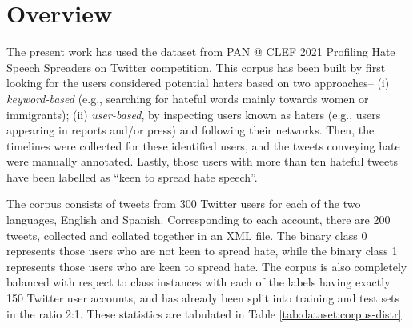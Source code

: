 
\section{Overview}
\label{sec:dataset:overview}
The present work has used the dataset from PAN @ CLEF 2021 Profiling Hate Speech Spreaders on Twitter \cite{pan21dataset} competition. This corpus has been built by first looking for the users considered potential haters based on two approaches-- (i) \emph{keyword-based} (e.g., searching for hateful words mainly towards women or immigrants); (ii) \emph{user-based}, by inspecting users known as haters (e.g., users appearing in reports and/or
press) and following their networks. Then, the timelines were collected for these identified users, and the tweets conveying hate were manually annotated. Lastly, those users with more than ten hateful tweets have been labelled as “keen to spread hate speech”.

The corpus consists of tweets from 300 Twitter users for each of the two languages, English and Spanish. Corresponding to each account, there are 200 tweets, collected and collated together in an XML file. The binary class 0 represents those users who are not keen to spread hate, while the binary class 1 represents those users who are keen to spread hate. The corpus is also completely balanced with respect to class instances with each of the labels having exactly 150 Twitter user accounts, and has already been split into training and test sets in the ratio 2:1. These statistics are tabulated in Table \ref{tab:dataset:corpus-distr}


